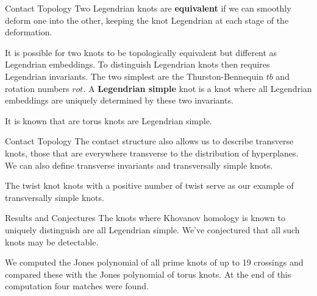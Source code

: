 \documentclass{beamer}
\begin{document}
    \begin{frame}{Contact Topology}
        Two Legendrian knots are \textbf{equivalent} if we can smoothly
        deform one into the other, keeping the knot Legendrian at each stage
        of the deformation.
        \par\hfill\par
        It is possible for two knots to be topologically equivalent but
        different as Legendrian embeddings. To distinguish Legendrian knots
        then requires Legendrian invariants. The two simplest are the
        Thurston-Bennequin $tb$ and rotation numbers $rot$. A
        \textbf{Legendrian simple} knot is a knot where all Legendrian
        embeddings are uniquely determined by these two invariants.
        \par\hfill\par
        It is known that are torus knots are Legendrian simple.
    \end{frame}
    \begin{frame}{Contact Topology}
        The contact structure also allows us to describe transverse knots,
        those that are everywhere transverse to the distribution of hyperplanes.
        We can also define transverse invariants and transversally simple
        knots.
        \par\hfill\par
        The twist knot knots with a positive number of twist serve as our
        example of transversally simple knots.
    \end{frame}
    \begin{frame}{Results and Conjectures}
        The knots where Khovanov homology is known to uniquely distinguish are
        all Legendrian simple. We've conjectured that all such knots may be
        detectable.
        \par\hfill\par
        We computed the Jones polynomial of all prime knots of
        up to 19 crossings and compared these with the Jones polynomial of
        torus knots. At the end of this computation four matches were found.
    \end{frame}
\end{document}
